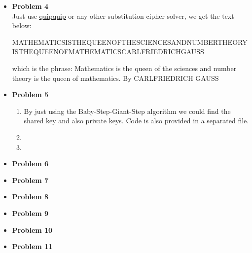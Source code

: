 \documentclass{article}
\begin{document}
\begin{itemize}
\begin{enumerate}[label=(\roman*)]
		\end{enumerate}
	\item{\textcolor{for}{\textbf{Problem 4}}}\\
		Just use \href{https://quipqiup.com/}{\underline{quipquip}} or any other substitution cipher solver, we get the text below:\\
		\begin{small}
			MATHEMATICSISTHEQUEENOFTHESCIENCESANDNUMBERTHEORYISTHEQUEENOFMATHEMATICSCARLFRIEDRICHGAUSS 
		\end{small}
		which is the phrase:
			Mathematics is the queen of the sciences and number theory is the queen of mathematics. By CARLFRIEDRICH GAUSS
	\item{\textcolor{for}{\textbf{Problem 5}}}
		\begin{enumerate}[label=(\alph*)]
			\item By just using the Baby-Step-Giant-Step algorithm we could find the shared key and also private keys.
				Code is also provided in a separated file.
			\item
			\item
		\end{enumerate}
	\item{\textcolor{for}{\textbf{Problem 6}}}
	\item{\textcolor{for}{\textbf{Problem 7}}}
	\item{\textcolor{for}{\textbf{Problem 8}}}
	\item{\textcolor{for}{\textbf{Problem 9}}}
	\item{\textcolor{for}{\textbf{Problem 10}}}
	\item{\textcolor{for}{\textbf{Problem 11}}}
\end{itemize}
\end{document}
